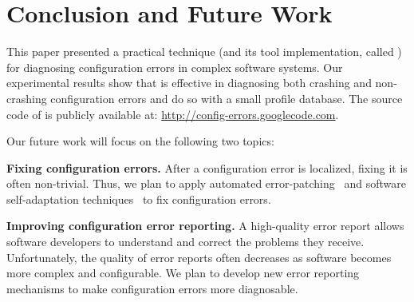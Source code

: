 \section{Conclusion and Future Work}

This paper presented a practical technique (and
its tool implementation, called \ourtool) for diagnosing
configuration errors in complex software systems.
Our experimental results show that \ourtool is effective in
diagnosing both crashing and non-crashing configuration errors
and do so with a small profile database.
The source code of \ourtool is publicly available at:
\url{http://config-errors.googlecode.com}.

\vspace{1mm}

Our future
work will focus on the following two topics:

\textbf{Fixing configuration errors.} After a configuration error
is localized, fixing it is
often non-trivial. Thus, we
plan to apply automated error-patching~\cite{rangefix} and
software self-adaptation techniques~\cite{Wang:2009:STR} to
fix configuration errors.


\textbf{Improving configuration error reporting.} A high-quality
error report allows software developers to understand and correct the problems
they receive. 
Unfortunately, the quality of error reports often
decreases as software becomes more complex and configurable.
We plan to develop new error reporting mechanisms
to make configuration errors
more diagnosable.


